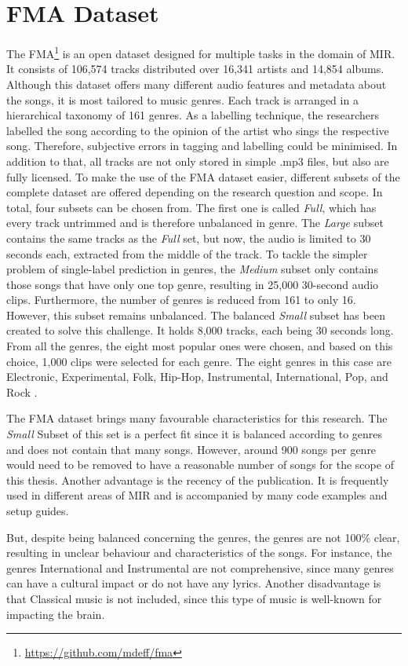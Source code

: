   \section{FMA Dataset}
    The \ac{FMA}\footnote{\url{https://github.com/mdeff/fma}} is an open dataset designed for multiple tasks in the domain of \ac{MIR}. It consists of 106,574 tracks distributed over 16,341 artists and 14,854 albums. Although this dataset offers many different audio features and metadata about the songs, it is most tailored to music genres. Each track is arranged in a hierarchical taxonomy of 161 genres. As a labelling technique, the researchers labelled the song according to the opinion of the artist who sings the respective song. Therefore, subjective errors in tagging and labelling could be minimised. In addition to that, all tracks are not only stored in simple .mp3 files, but also are fully licensed. To make the use of the \ac{FMA} dataset easier, different subsets of the complete dataset are offered depending on the research question and scope. In total, four subsets can be chosen from. The first one is called \textit{Full}, which has every track untrimmed and is therefore unbalanced in genre. The \textit{Large} subset contains the same tracks as the \textit{Full} set, but now, the audio is limited to 30 seconds each, extracted from the middle of the track. To tackle the simpler problem of single-label prediction in genres, the \textit{Medium} subset only contains those songs that have only one top genre, resulting in 25,000 30-second audio clips. Furthermore, the number of genres is reduced from 161 to only 16. However, this subset remains unbalanced. The balanced \textit{Small} subset has been created to solve this challenge. It holds 8,000 tracks, each being 30 seconds long. From all the genres, the eight most popular ones were chosen, and based on this choice, 1,000 clips were selected for each genre. The eight genres in this case are Electronic, Experimental, Folk, Hip-Hop, Instrumental, International, Pop, and Rock \cite{defferrard2016fma}. \par
    The \ac{FMA} dataset brings many favourable characteristics for this research. The \textit{Small} Subset of this set is a perfect fit since it is balanced according to genres and does not contain that many songs. However, around 900 songs per genre would need to be removed to have a reasonable number of songs for the scope of this thesis. Another advantage is the recency of the publication. It is frequently used in different areas of \ac{MIR} and is accompanied by many code examples and setup guides.\par
    But, despite being balanced concerning the genres, the genres are not 100\% clear, resulting in unclear behaviour and characteristics of the songs. For instance, the genres International and Instrumental are not comprehensive, since many genres can have a cultural impact or do not have any lyrics. Another disadvantage is that Classical music is not included, since this type of music is well-known for impacting the brain. 

